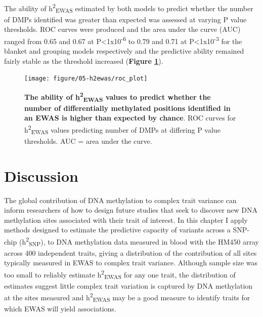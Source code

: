 \documentclass[11pt,twoside]{bristolthesis}
\begin{document}
The ability of h\textsuperscript{2}\textsubscript{EWAS} estimated by both models to predict whether the number of DMPs identified was greater than expected was assessed at varying P value thresholds. ROC curves were produced and the area under the curve (AUC) ranged from 0.65 and 0.67 at P\textless1x10\textsuperscript{-6} to 0.79 and 0.71 at P\textless1x10\textsuperscript{-3} for the blanket and grouping models respectively and the predictive ability remained fairly stable as the threshold increased (\textbf{Figure \ref{fig:h2ewas-dmp-roc-curve}}).




\begin{figure}[!hb]

{\centering \texttt{[image: figure/05-h2ewas/roc\_plot]} 

}

\caption[The ability of h\textsuperscript{2}\textsubscript{EWAS} values to predict whether the number of differentially methylated positions identified in an EWAS is higher than expected by chance]{\textbf{The ability of h\textsuperscript{2}\textsubscript{EWAS} values to predict whether the number of differentially methylated positions identified in an EWAS is higher than expected by chance}. ROC curves for h\textsuperscript{2}\textsubscript{EWAS} values predicting number of DMPs at differing P value thresholds. AUC = area under the curve.}\label{fig:h2ewas-dmp-roc-curve}
\end{figure}
\pagebreak

\hypertarget{discussion-05}{%
\section{Discussion}\label{discussion-05}}

The global contribution of DNA methylation to complex trait variance can inform researchers of how to design future studies that seek to discover new DNA methylation sites associated with their trait of interest. In this chapter I apply methods designed to estimate the predictive capacity of variants across a SNP-chip (h\textsuperscript{2}\textsubscript{SNP}), to DNA methylation data measured in blood with the HM450 array across 400 independent traits, giving a distribution of the contribution of all sites typically measured in EWAS to complex trait variance. Although sample size was too small to reliably estimate h\textsuperscript{2}\textsubscript{EWAS} for any one trait, the distribution of estimates suggest little complex trait variation is captured by DNA methylation at the sites measured and h\textsuperscript{2}\textsubscript{EWAS} may be a good measure to identify traits for which EWAS will yield associations.
\end{document}
